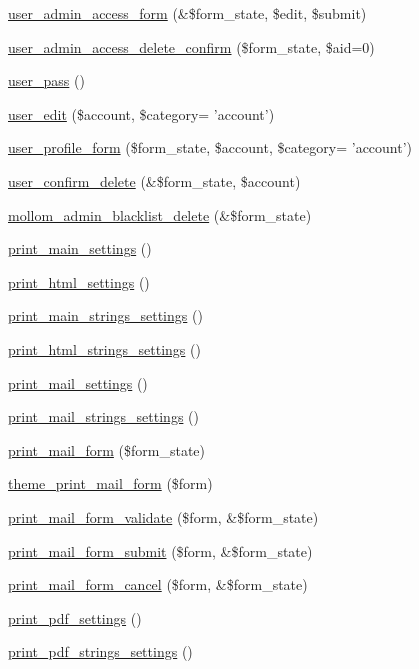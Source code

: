 \begin{CompactItemize}
\hyperlink{group__forms_g47c21b0d7ce383f4e8b25a71b064a8ef}{user\_\-admin\_\-access\_\-form} (\&\$form\_\-state, \$edit, \$submit)
\item 
\hyperlink{group__forms_g616ad786bd3f986b01b73f554527203f}{user\_\-admin\_\-access\_\-delete\_\-confirm} (\$form\_\-state, \$aid=0)
\item 
\hyperlink{group__forms_gd7f952e136ebcff493ca8de7209100cf}{user\_\-pass} ()
\item 
\hyperlink{group__forms_gd1dd92a806e43b841305962c7331818b}{user\_\-edit} (\$account, \$category= 'account')
\item 
\hyperlink{group__forms_g7e8a3661add00171d560bec439570fd7}{user\_\-profile\_\-form} (\$form\_\-state, \$account, \$category= 'account')
\item 
\hyperlink{group__forms_gd250319bfea19c155bc374bad024be1a}{user\_\-confirm\_\-delete} (\&\$form\_\-state, \$account)
\item 
\hyperlink{group__forms_g8aa3d33609ffa56c5eba65649c82eec8}{mollom\_\-admin\_\-blacklist\_\-delete} (\&\$form\_\-state)
\item 
\hyperlink{group__forms_g0a7214cffcd5913ec418ba687c227ae6}{print\_\-main\_\-settings} ()
\item 
\hyperlink{group__forms_g8cfc5989dfb4cdc66967e6cc9c4dab0f}{print\_\-html\_\-settings} ()
\item 
\hyperlink{group__forms_gdb8dcfa4733567c0396a808794e2cc99}{print\_\-main\_\-strings\_\-settings} ()
\item 
\hyperlink{group__forms_g082a0d12b2a36c3aa0d771b982ef414f}{print\_\-html\_\-strings\_\-settings} ()
\item 
\hyperlink{group__forms_gb3489dff3d2771599274bed287d0094e}{print\_\-mail\_\-settings} ()
\item 
\hyperlink{group__forms_gf73e954e3100496d07d88525e9349ca6}{print\_\-mail\_\-strings\_\-settings} ()
\item 
\hyperlink{group__forms_g4ed8b70bdf0ff196b847618f76378c06}{print\_\-mail\_\-form} (\$form\_\-state)
\item 
\hyperlink{group__forms_gdfd29c42f8222a01806b51c82db1a71b}{theme\_\-print\_\-mail\_\-form} (\$form)
\item 
\hyperlink{group__forms_ga2d6456473de55b23efba0e78f45a2ac}{print\_\-mail\_\-form\_\-validate} (\$form, \&\$form\_\-state)
\item 
\hyperlink{group__forms_g7246132b43dcb17338c06d0514cee450}{print\_\-mail\_\-form\_\-submit} (\$form, \&\$form\_\-state)
\item 
\hyperlink{group__forms_gf9d1d6734a5f84ab0272b1ff7d9f0344}{print\_\-mail\_\-form\_\-cancel} (\$form, \&\$form\_\-state)
\item 
\hyperlink{group__forms_g3075efa118434fae1fcb238d7426eeb4}{print\_\-pdf\_\-settings} ()
\item 
\hyperlink{group__forms_g55fb8f5f7b18ed1814abfd2cadeac08b}{print\_\-pdf\_\-strings\_\-settings} ()
\end{CompactItemize}


